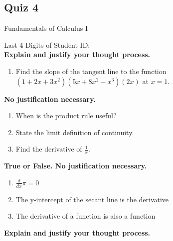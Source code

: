 \documentclass[a4paper, 12pt]{article}
\title{}
\date{}
\newcommand{\bt}[1]{\textbf{#1}} %
\begin{document}
\begin{center}
\section*{Quiz 4}
Fundamentals of Calculus I
\end{center}

Last 4 Digits of Student ID: \underline{\hspace{5cm}} \\

\bt{Explain and justify your thought process.}

\begin{enumerate}
    \item Find the slope of the tangent line to the function 
    $(1+2x + 3x^2)(5x +8x^2-x^3)(2x)$ at $x=1$.
    \vspace{4cm}
\end{enumerate}

\bt{No justification necessary.}

\begin{enumerate}[resume]
    \item When is the product rule useful?
    \vspace{2cm}
    \item State the limit definition of continuity.
    \vspace{2cm}
    \item Find the derivative of $\frac{1}{x}$.
    \vspace{2cm}
\end{enumerate}

\bt{True or False. No justification necessary.}

\begin{enumerate}[resume]
    \item \underline{\hspace{1.5cm}} $\frac{d}{dx} \pi = 0$
    \item \underline{\hspace{1.5cm}} The y-intercept of the secant line is the derivative
    \item \underline{\hspace{1.5cm}} The derivative of a function is also a function
\end{enumerate}

\newpage

\bt{Explain and justify your thought process.}
\end{document}

